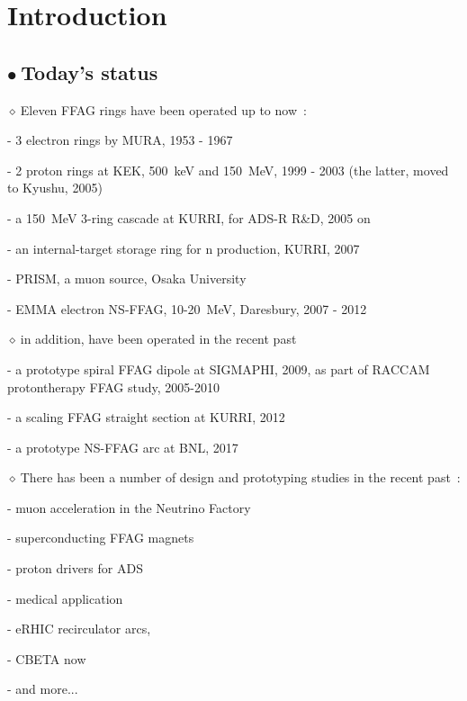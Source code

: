 \documentclass[12pt]{article}
\newcommand{\nib}{\noindent \ensuremath{\bullet~}}
\newcommand{\nid}{\noindent \ensuremath{\diamond~}}
\newcommand{\black}{\color{black}}
\newcommand{\blue}{\color{blue}}
\begin{document}
\clearpage


\section{\LARGE Introduction}

{\fontsize{18}{23} \selectfont

\subsection*{\LARGE \nib Today's status}

\blue
\nid Eleven FFAG rings have been  operated up to now~:     
\black

\medskip

- 3 electron rings by  MURA,  1953 - 1967~\cite{FTCole,MarkI,MarkV,MarkLast}

- 2 proton rings at KEK, 500~keV and 150~MeV,  1999 - 2003 (the latter, moved to Kyushu, 2005)~\cite{POP,FFAG150}

- a 150~MeV 3-ring cascade  at KURRI, for ADS-R R\&D, 2005 on~\cite{KURRIKUCA}

- an internal-target storage ring for n production, KURRI, 2007~\cite{ERIT}

- PRISM, a muon source, Osaka University~\cite{PRISM}

- EMMA electron NS-FFAG, 10-20~MeV, Daresbury,  2007 - 2012~\cite{EMMA}

\medskip

\blue
\nid in addition, have been operated in the recent past
\black

- a prototype spiral FFAG dipole at SIGMAPHI, 2009, as part of RACCAM protontherapy FFAG study, 2005-2010~\cite{RACCAM}

- a scaling FFAG straight section at KURRI, 2012~\cite{FFAGBLine}

 - a prototype NS-FFAG arc at BNL, 2017~\cite{BrooksNSFFAGArc}

\medskip

\blue
\nid There has been a number of design and prototyping studies in the recent past~:
\black

- muon acceleration in the Neutrino Factory~\cite{NuFactJ,EUNuFact,USNuFact}

- superconducting FFAG magnets~\cite{FFAGWrkshps}

- proton drivers for ADS~\cite{FermipDrivFFAG,Ruggiero}

- medical application~\cite{DejanRAST,ERIT,RACCAM}

- eRHIC recirculator arcs,

- CBETA now

- and more...


} %
\end{document}
